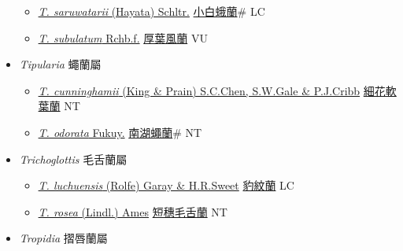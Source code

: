 \begin{itemize}
\begin{itemize}
        \item[] \href{http://www.theplantlist.org/tpl1.1/search?q=Thrixspermum+saruwatarii}{\textit{T. saruwatarii} (Hayata) Schltr.}   \href{\detokenize{http://taibnet.sinica.edu.tw/chi/taibnet_species_list.php?T2=小白蛾蘭&T2_new_value=true&fr=y}}{小白蛾蘭}\# LC
        \item[] \href{http://www.theplantlist.org/tpl1.1/search?q=Thrixspermum+subulatum}{\textit{T. subulatum} Rchb.f.}   \href{\detokenize{http://taibnet.sinica.edu.tw/chi/taibnet_species_list.php?T2=厚葉風蘭&T2_new_value=true&fr=y}}{厚葉風蘭} VU
  \end{itemize}
 \item[] \textit{Tipularia} 蠅蘭屬
                    
  \begin{itemize}
        \item[] \href{http://www.theplantlist.org/tpl1.1/search?q=Tipularia+cunninghamii}{\textit{T. cunninghamii} (King \& Prain) S.C.Chen, S.W.Gale \& P.J.Cribb}   \href{\detokenize{http://taibnet.sinica.edu.tw/chi/taibnet_species_list.php?T2=細花軟葉蘭&T2_new_value=true&fr=y}}{細花軟葉蘭} NT
        \item[] \href{http://www.theplantlist.org/tpl1.1/search?q=Tipularia+odorata}{\textit{T. odorata} Fukuy.}   \href{\detokenize{http://taibnet.sinica.edu.tw/chi/taibnet_species_list.php?T2=南湖蠅蘭&T2_new_value=true&fr=y}}{南湖蠅蘭}\# NT
  \end{itemize}
 \item[] \textit{Trichoglottis} 毛舌蘭屬
                    
  \begin{itemize}
        \item[] \href{http://www.theplantlist.org/tpl1.1/search?q=Trichoglottis+luchuensis}{\textit{T. luchuensis} (Rolfe) Garay \& H.R.Sweet}     \href{\detokenize{http://taibnet.sinica.edu.tw/chi/taibnet_species_list.php?T2=豹紋蘭&T2_new_value=true&fr=y}}{豹紋蘭} LC
        \item[] \href{http://www.theplantlist.org/tpl1.1/search?q=Trichoglottis+rosea}{\textit{T. rosea} (Lindl.) Ames}   \href{\detokenize{http://taibnet.sinica.edu.tw/chi/taibnet_species_list.php?T2=短穗毛舌蘭&T2_new_value=true&fr=y}}{短穗毛舌蘭} NT
  \end{itemize}
 \item[] \textit{Tropidia} 摺唇蘭屬
                    

\end{itemize}
